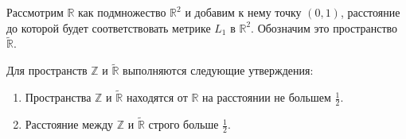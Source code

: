 \documentclass[11pt,twoside,draft
]{article}
\begin{document}
Рассмотрим $\mathbb{R}$ как подмножество
$\mathbb{R}^2$ и добавим к нему точку $(0,1)$, расстояние до которой будет
соответствовать метрике $L_{1}$ в $\mathbb{R}^2$. Обозначим это
пространство $\widetilde{\mathbb{R}}$.
\begin{theorem}
	Для пространств $\mathbb{Z}$ и $\widetilde{\mathbb{R}}$ выполняются следующие
	утверждения:
	\begin{enumerate}
		\item Пространства $\mathbb{Z}$ и $\widetilde{\mathbb{R}}$ находятся от $\mathbb{R}$
		на расстоянии не большем $\frac 1 2$.\label{thrmPt:1}
		\item Расстояние между $\mathbb{Z}$ и $\widetilde{\mathbb{R}}$ строго
		больше $\frac 1 2$.\label{thrmPt:2}
	\end{enumerate}
	\label{thrmRUltraMetric}
\end{theorem}
\end{document}
